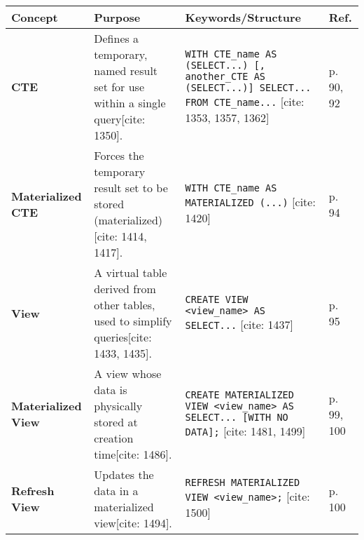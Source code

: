 \documentclass[12pt,a4paper]{article}
\begin{document}
\begin{longtable}{>{\bfseries}p{} p{} p{} p{}}
\toprule
\textbf{Concept} & \textbf{Purpose} & \textbf{Keywords/Structure} & \textbf{Ref.} \\
\midrule
\endhead
\textbf{CTE} & Defines a temporary, named result set for use within a single query[cite: 1350]. & \texttt{WITH CTE\_name AS (SELECT...) [, another\_CTE AS (SELECT...)] SELECT... FROM CTE\_name...} [cite: 1353, 1357, 1362] & p. 90, 92 \\
\textbf{Materialized CTE} & Forces the temporary result set to be stored (materialized)[cite: 1414, 1417]. & \texttt{WITH CTE\_name AS MATERIALIZED (...)} [cite: 1420] & p. 94 \\
\textbf{View} & A virtual table derived from other tables, used to simplify queries[cite: 1433, 1435]. & \texttt{CREATE VIEW \textless view\_name\textgreater\ AS SELECT...} [cite: 1437] & p. 95 \\
\textbf{Materialized View} & A view whose data is physically stored at creation time[cite: 1486]. & \texttt{CREATE MATERIALIZED VIEW \textless view\_name\textgreater\ AS SELECT... [WITH NO DATA];} [cite: 1481, 1499] & p. 99, 100 \\
\textbf{Refresh View} & Updates the data in a materialized view[cite: 1494]. & \texttt{REFRESH MATERIALIZED VIEW \textless view\_name\textgreater;} [cite: 1500] & p. 100 \\
\bottomrule
\end{longtable}
\end{document}
